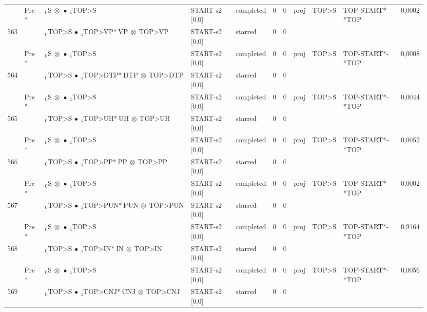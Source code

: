 \documentclass[10pt]{article}
\begin{document}
\begin{longtable}[htbp]{lllllllllll}
 & Pre *& $ {}_0 \textrm{S} \  \otimes \  \bullet \ {}_{4} \textrm{TOP>S} $ & START-s2 [0,0] & completed & 0 & 0 & proj & TOP>S & TOP-START*-*TOP & 0,0002 \\ 
563 & & $ {}_0 \textrm{TOP>S} \  \bullet \ {}_{4} \textrm{TOP>VP*} \ \textrm{VP} \  \otimes \ \textrm{TOP>VP} $ & START-s2 [0,0] & starred & 0 & 0 & & & & \\ 
 & Pre *& $ {}_0 \textrm{S} \  \otimes \  \bullet \ {}_{4} \textrm{TOP>S} $ & START-s2 [0,0] & completed & 0 & 0 & proj & TOP>S & TOP-START*-*TOP & 0,0008 \\ 
564 & & $ {}_0 \textrm{TOP>S} \  \bullet \ {}_{4} \textrm{TOP>DTP*} \ \textrm{DTP} \  \otimes \ \textrm{TOP>DTP} $ & START-s2 [0,0] & starred & 0 & 0 & & & & \\ 
 & Pre *& $ {}_0 \textrm{S} \  \otimes \  \bullet \ {}_{4} \textrm{TOP>S} $ & START-s2 [0,0] & completed & 0 & 0 & proj & TOP>S & TOP-START*-*TOP & 0,0044 \\ 
565 & & $ {}_0 \textrm{TOP>S} \  \bullet \ {}_{4} \textrm{TOP>UH*} \ \textrm{UH} \  \otimes \ \textrm{TOP>UH} $ & START-s2 [0,0] & starred & 0 & 0 & & & & \\ 
 & Pre *& $ {}_0 \textrm{S} \  \otimes \  \bullet \ {}_{4} \textrm{TOP>S} $ & START-s2 [0,0] & completed & 0 & 0 & proj & TOP>S & TOP-START*-*TOP & 0,0052 \\ 
566 & & $ {}_0 \textrm{TOP>S} \  \bullet \ {}_{4} \textrm{TOP>PP*} \ \textrm{PP} \  \otimes \ \textrm{TOP>PP} $ & START-s2 [0,0] & starred & 0 & 0 & & & & \\ 
 & Pre *& $ {}_0 \textrm{S} \  \otimes \  \bullet \ {}_{4} \textrm{TOP>S} $ & START-s2 [0,0] & completed & 0 & 0 & proj & TOP>S & TOP-START*-*TOP & 0,0002 \\ 
567 & & $ {}_0 \textrm{TOP>S} \  \bullet \ {}_{4} \textrm{TOP>PUN*} \ \textrm{PUN} \  \otimes \ \textrm{TOP>PUN} $ & START-s2 [0,0] & starred & 0 & 0 & & & & \\ 
 & Pre *& $ {}_0 \textrm{S} \  \otimes \  \bullet \ {}_{4} \textrm{TOP>S} $ & START-s2 [0,0] & completed & 0 & 0 & proj & TOP>S & TOP-START*-*TOP & 0,9164 \\ 
568 & & $ {}_0 \textrm{TOP>S} \  \bullet \ {}_{4} \textrm{TOP>IN*} \ \textrm{IN} \  \otimes \ \textrm{TOP>IN} $ & START-s2 [0,0] & starred & 0 & 0 & & & & \\ 
 & Pre *& $ {}_0 \textrm{S} \  \otimes \  \bullet \ {}_{4} \textrm{TOP>S} $ & START-s2 [0,0] & completed & 0 & 0 & proj & TOP>S & TOP-START*-*TOP & 0,0056 \\ 
569 & & $ {}_0 \textrm{TOP>S} \  \bullet \ {}_{4} \textrm{TOP>CNJ*} \ \textrm{CNJ} \  \otimes \ \textrm{TOP>CNJ} $ & START-s2 [0,0] & starred & 0 & 0 & & & & \\ 

\end{longtable}
\end{document}
